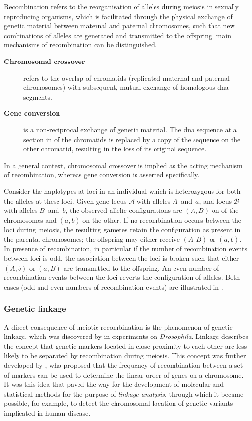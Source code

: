 Recombination refers to the reorganisation of alleles during meiosis in sexually reproducing organisms, which is facilitated through the physical exchange of genetic material between maternal and paternal chromosomes, such that new combinations of alleles are generated and transmitted to the offspring.
 main mechanisms of recombination can be distinguished.
\begin{description}
	\item[\textbf{Chromosomal crossover}] refers to the overlap of  chromatids (replicated maternal and paternal chromosomes) with subsequent, mutual exchange of homologous \gls{dna} segments.
	\item[\textbf{Gene conversion}] is a non-reciprocal exchange of genetic material.
	The \gls{dna} sequence at a section in  of the chromatids is replaced by a copy of the sequence on the other chromatid, resulting in the loss of its original sequence.
\end{description}
In a general context, chromosomal crossover is implied as the acting mechanism of recombination, whereas gene conversion is asserted specifically.

%

%

Consider the haplotypes at  loci in an individual which is heterozygous for both the alleles at these loci.
Given gene locus $\mathcal{A}$ with alleles $A$~and~$a$, and locus $\mathcal{B}$ with alleles $B$~and~$b$, the observed allelic configurations are $(A,B)$ on  of the chromosomes and $(a,b)$ on the other.
If no recombination occurs between the  loci during meiosis, the resulting gametes retain the configuration as present in the parental chromosomes; \ie the offspring may either receive $(A,B)$ or $(a,b)$.
In presence of recombination, in particular if the number of recombination events between loci is odd, the association between the  loci is broken such that either $(A,b)$ or $(a,B)$ are transmitted to the offspring.
An even number of recombination events between the  loci reverts the configuration of alleles.
Both cases (odd and even numbers of recombination events) are illustrated in .


%
\subsubsection{Genetic linkage}
\label{sec:linkage}
%

A direct consequence of meiotic recombination is the phenomenon of genetic linkage, which was discovered by \citet{morgan1911} in experiments on \textsl{Drosophila}.
Linkage describes the concept that genetic markers located in close proximity to each other are less likely to be separated by recombination during meiosis.
This concept was further developed by \citet{sturtevant1913}, who proposed that the frequency of recombination between a set of markers can be used to determine the linear order of genes on a chromosome.
It was this idea that paved the way for the development of molecular and statistical methods for the purpose of \emph{linkage analysis}, through which it became possible, for example, to detect the chromosomal location of genetic variants implicated in human disease.

